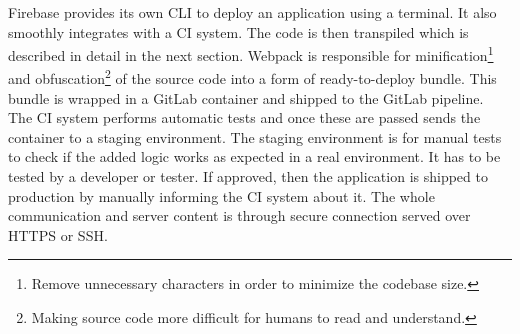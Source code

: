 \documentclass{article} %
\begin{document}
Firebase provides its own CLI to deploy an application using a terminal. It also smoothly integrates with a CI system. The code is then transpiled which is described in detail in the next section. Webpack is responsible for minification\footnote{Remove unnecessary characters in order to minimize the codebase size.} and obfuscation\footnote{Making source code more difficult for humans to read and understand.} of the source code into a form of ready-to-deploy bundle. This bundle is wrapped in a GitLab container and shipped to the GitLab pipeline. The CI system performs automatic tests and once these are passed sends the container to a staging environment. The staging environment is for manual tests to check if the added logic works as expected in a real environment. It has to be tested by a developer or tester. If approved, then the application is shipped to production by manually informing the CI system about it. The whole communication and server content is through secure connection served over HTTPS or SSH.
\end{document}

